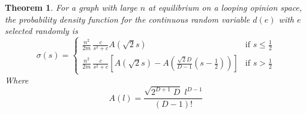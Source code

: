 \documentclass[a4paper,10pt]{article}
\newtheorem{theorem}{Theorem}
\begin{document}
\begin{theorem}
\label{thm:length-distro}
 For a graph with large $n$ at equilibrium on a looping opinion space, the probability density function for the continuous random variable $d(e)$ with $e$ selected randomly is
 \begin{equation}
 \sigma(s) = 
	\begin{cases}
		\frac{n^2}{2m}\,\frac{c}{s^2 + c} A(\sqrt{2} s) & \mbox{if } s \leq \frac{1}{2} \\
	   	\frac{n^2}{2m}\,\frac{c}{s^2 + c} \left[A(\sqrt{2} s) - A\left(\frac{\sqrt{2}D}{D-1}\left(s-\frac{1}{2}\right)\right)\right] & \mbox{if } s > \frac{1}{2}
	\end{cases}
  \end{equation}
Where
  \begin{equation}
	A(l) = \frac{\sqrt{2^{D+1}\;D} \; l^{D-1}}{(D-1)!}
  \end{equation} 
\end{theorem}
\end{document}
